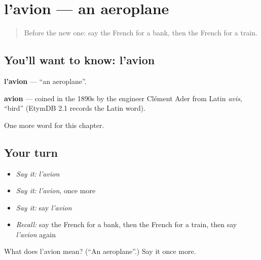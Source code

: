 \section[l'avion]{l'avion — an aeroplane}

\label{lesson:FR-C99-avion}



\begin{quote}
Before the new one: say the French for a bank, then the French for a train.
\end{quote}

\subsection*{You'll want to know: l'avion}
\textbf{l'avion} — \textquotedblleft{}an aeroplane\textquotedblright{}.

\begin{cousinweb}
\textbf{avion} — coined in the 1890s by the engineer Clément Ader from Latin \emph{avis}, \textquotedblleft{}bird\textquotedblright{} (EtymDB 2.1 records the Latin word).
\end{cousinweb}

\begin{grammarlens}[title={What you've built}]
One more word for this chapter.
\end{grammarlens}

\subsection*{Your turn}
\begin{itemize}
\raggedright
  \item \emph{Say it:} \emph{l'avion}
  \item \emph{Say it:} \emph{l'avion}, once more
  \item \emph{Say it:} say \emph{l'avion}
  \item \emph{Recall:} say the French for a bank, then the French for a train, then say \emph{l'avion} again
\end{itemize}

\begin{tcolorbox}[breakable,colback=teal!4,colframe=teal!35!black,title={Before you move on}]
What does l'avion mean? (\textquotedblleft{}An aeroplane\textquotedblright{}.) Say it once more.
\end{tcolorbox}
